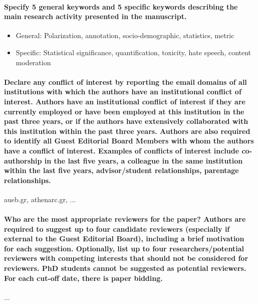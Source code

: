 \documentclass[pdflatex,sn-nature]{sn-jnl}
\begin{document}
	\paragraph{Specify 5 general keywords and 5 specific keywords describing the main research activity presented in the manuscript.}
	
	\begin{itemize}
		\item General: Polarization, annotation, socio-demographic, statistics, metric
		\item Specific: Statistical significance, quantification, toxicity, hate speech, content moderation
	\end{itemize}

	
	\paragraph{Declare any conflict of interest by reporting the email domains of all institutions with which the authors have an institutional conflict of interest. Authors have an institutional conflict of interest if they are currently employed or have been employed at this institution in the past three years, or if the authors have extensively collaborated with this institution within the past three years. Authors are also required to identify all Guest Editorial Board Members with whom the authors have a conflict of interest. Examples of conflicts of interest include co-authorship in the last five years, a colleague in the same institution within the last five years, advisor/student relationships, parentage relationships.}
	aueb.gr, athenarc.gr, ...
	
	\paragraph{Who are the most appropriate reviewers for the paper? Authors are required to suggest up to four candidate reviewers (especially if external to the Guest Editorial Board), including a brief motivation for each suggestion. Optionally, list up to four researchers/potential reviewers with competing interests that should not be considered for reviewers. PhD students cannot be suggested as potential reviewers. For each cut-off date, there is paper bidding.}
	...
	
	
	
	
\end{document}
